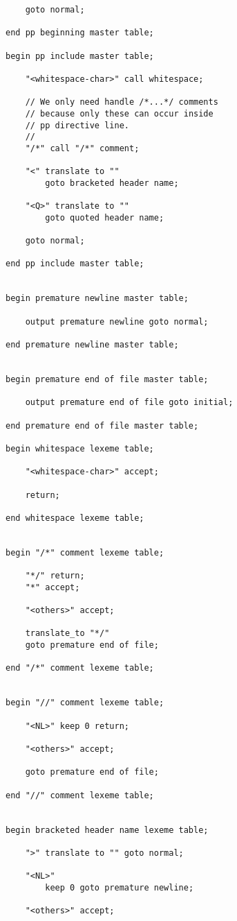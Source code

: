 \documentclass[12pt]{article}
\newenvironment{indpar}[1][0.3in]%
	{\begin{list}{}%
		     {\setlength{\itemsep}{0in}%
		      \setlength{\topsep}{0in}%
		      \setlength{\parsep}{1ex}%
		      \setlength{\labelwidth}{#1}%
		      \setlength{\leftmargin}{#1}%
		      \addtolength{\leftmargin}{\labelsep}}%
	 \item}%
	{\end{list}}
\begin{document}
\begin{indpar}
\begin{verbatim}
    goto normal;

end pp beginning master table;

begin pp include master table;

    "<whitespace-char>" call whitespace;

    // We only need handle /*...*/ comments
    // because only these can occur inside
    // pp directive line.
    //
    "/*" call "/*" comment;

    "<" translate to ""
        goto bracketed header name;

    "<Q>" translate to ""
        goto quoted header name;

    goto normal;

end pp include master table;


begin premature newline master table;

    output premature newline goto normal;

end premature newline master table;


begin premature end of file master table;

    output premature end of file goto initial;

end premature end of file master table;

begin whitespace lexeme table;

    "<whitespace-char>" accept;

    return;

end whitespace lexeme table;


begin "/*" comment lexeme table;

    "*/" return;
    "*" accept;

    "<others>" accept;

    translate_to "*/"
    goto premature end of file;

end "/*" comment lexeme table;


begin "//" comment lexeme table;

    "<NL>" keep 0 return;

    "<others>" accept;

    goto premature end of file;

end "//" comment lexeme table;


begin bracketed header name lexeme table;

    ">" translate to "" goto normal;

    "<NL>"
        keep 0 goto premature newline;

    "<others>" accept;


\end{verbatim}
\end{indpar}
\end{document}
